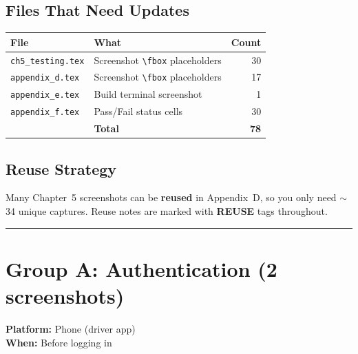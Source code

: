 \documentclass[11pt,a4paper]{article}
\begin{document}
\subsection{Files That Need Updates}
\begin{center}
\begin{tabular}{llr}
  \toprule
  \textbf{File} & \textbf{What} & \textbf{Count} \\
  \midrule
  \texttt{ch5\_testing.tex}  & Screenshot \texttt{\textbackslash fbox} placeholders & 30 \\
  \texttt{appendix\_d.tex}   & Screenshot \texttt{\textbackslash fbox} placeholders & 17 \\
  \texttt{appendix\_e.tex}   & Build terminal screenshot               & 1 \\
  \texttt{appendix\_f.tex}   & Pass/Fail status cells                  & 30 \\
  \midrule
  & \textbf{Total}                                         & \textbf{78} \\
  \bottomrule
\end{tabular}
\end{center}

\subsection{Reuse Strategy}
Many Chapter~5 screenshots can be \textbf{reused} in Appendix~D, so you only need $\sim$34 unique captures. Reuse notes are marked with {\color{reuseorange}\textbf{REUSE}} tags throughout.

\vspace{6pt}
\noindent\rule{\textwidth}{0.4pt}

\section{Group A: Authentication (2 screenshots)}

\textbf{Platform:} Phone (driver app) \\
\textbf{When:} Before logging in
\end{document}
